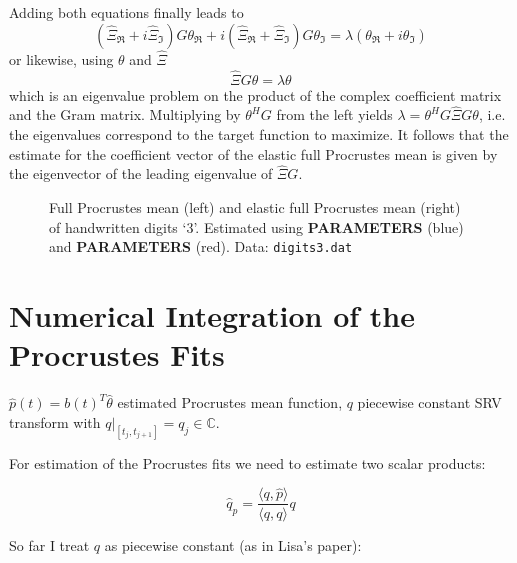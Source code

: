 Adding both equations finally leads to  
\begin{equation}
  ( \hat\Xi_\Re + i \hat\Xi_\Im) G \theta_\Re + i (\hat\Xi_\Re + \hat\Xi_\Im) G \theta_\Im = \lambda ( \theta_\Re + i \theta_\Im)
\end{equation}
or likewise, using $\theta$ and $\hat\Xi$
\begin{equation}
  \hat\Xi G \theta = \lambda \theta
\end{equation}
which is an eigenvalue problem on the product of the complex coefficient matrix and the Gram matrix.
Multiplying by $\theta^H G$ from the left yields $\lambda = \theta^H G \hat\Xi G \theta$, i.e. the eigenvalues correspond to the target function to maximize.
It follows that the estimate for the coefficient vector of the elastic full Procrustes mean is given by the eigenvector of the leading eigenvalue of $\hat\Xi G$.

\begin{figure}
  \centering
  \begin{subfigure}{.48\textwidth}
    \centering
  \end{subfigure}\hfill%
  \begin{subfigure}{.48\textwidth}
    \centering
  \end{subfigure}
  \caption{Full Procrustes mean (left) and elastic full Procrustes mean (right) of handwritten digits \enquote*{3}. Estimated using \textbf{PARAMETERS} (blue) and \textbf{PARAMETERS} (red). Data: \texttt{digits3.dat}}
  \label{fig:3-mean}
\end{figure}



\section{Numerical Integration of the Procrustes Fits}
\label{sec:3-pfits}

$\hat{p}(t) = b(t)^T \hat{\theta}$ estimated Procrustes mean function, $q$ piecewise constant SRV transform with $q|_{[t_j, t_{j+1}]} = q_j \in \mathbb{C}$.

For estimation of the Procrustes fits we need to estimate two scalar products:

$$ \hat{q}_{p} = \frac{\langle q,\hat{p} \rangle}{\langle q, q \rangle} q $$

So far I treat $q$ as piecewise constant (as in Lisa's paper):

